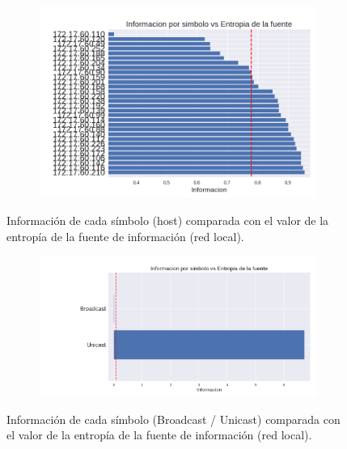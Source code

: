 \begin{figure}[h]
  \begin{subfigure}{.5\textwidth}
    \includegraphics[width=\textwidth]{imagenes/mc/mchosts.png}
  \end{subfigure}
  \label{fig:exp4_hosts_infovsentro}
  \caption{Información de cada símbolo (host) comparada con el valor de la entropía de la fuente de información (red local).}
\end{figure}


\begin{figure}[h]
  \begin{subfigure}{.5\textwidth}
    \includegraphics[width=\textwidth]{imagenes/mc/mcbrvsuni.png}
  \end{subfigure}
  \label{fig:exp4_univsbr_infovsentro}
  \caption{Información de cada símbolo (Broadcast / Unicast) comparada con el valor de la entropía de la fuente de información (red local).}
\end{figure}

